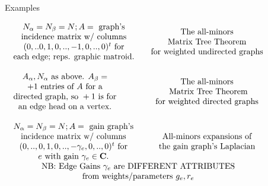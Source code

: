 \documentclass{beamer}
\begin{document}
\begin{frame}{Examples}
  
 \hspace*{-0.25in}$
  \begin{array}{lc}
    \begin{array}{c}
      N_\alpha=N_\beta=N; A = \text{\ graph's}\\
      \text{incidence matrix w/ columns}\\
      (0,..0,1,0,..,-1,0,..,0)^t\text{ for}\\
      \text{each edge; reps. graphic matroid.}
    \end{array}
    &
    \begin{array}{c}
      \text{The all-minors}\\
      \text{Matrix Tree Theorem}\\
    \text{for weighted undirected graphs}
    \end{array}
    \\ \\
    \begin{array}{c}
      A_\alpha, N_\alpha \text{ as above. }A_\beta=\\
      +1\text{\ entries of\ }A\text{ for a}\\
      \text{directed graph, so }+1\text{\ is for}\\
      \text{an edge head on a vertex.}\\
    \end{array}
    &
    \begin{array}{c}
      \text{The all-minors}\\
      \text{ Matrix Tree Theorem} \\
    \text{for weighted directed graphs}
    \end{array}
  \\ \\
    \begin{array}{c}
      N_\alpha=N_\beta=N; A = \text{\ gain graph's}\\
      \text{incidence matrix w/ columns}\\
      (0,..,0,1,0,..,-\gamma_e,0,..,0)^t\text{ for}\\
      e\text{ with gain } \gamma_e \in \mathbf{C}.
    \end{array}
    &
    \begin{array}{c}
      \text{All-minors expansions of}\\
      \text{the gain graph's Laplacian}
    \end{array}\\
    \multicolumn{2}{c}{\text{NB: Edge Gains\ }\gamma_e\text{\ are DIFFERENT ATTRIBUTES}}\\
    \multicolumn{2}{c}{\text{from weights/parameters\ }g_e,r_e}
  \end{array}
  $
\end{frame}
\end{document}
